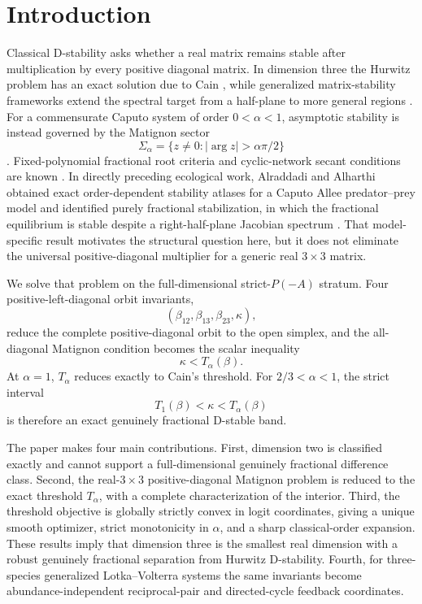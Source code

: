 \section{Introduction}

Classical D-stability asks whether a real matrix remains stable after multiplication by every positive diagonal matrix. In dimension three the Hurwitz problem has an exact solution due to Cain \citep{Cain1976}, while generalized matrix-stability frameworks extend the spectral target from a half-plane to more general regions \citep{Kushel2019,KushelPavani2022}. For a commensurate Caputo system of order \(0<\alpha<1\), asymptotic stability is instead governed by the Matignon sector
\[
\Sigma_\alpha=\{z\neq0:|\arg z|>\alpha\pi/2\}
\]
\citep{Matignon1996,BrandiburGarrappaKaslik2021}. Fixed-polynomial fractional root criteria and cyclic-network secant conditions are known \citep{CermakNechvatal2017,Bourafa2020,Siami2021}. In directly preceding ecological work, Alraddadi and Alharthi obtained exact order-dependent stability atlases for a Caputo Allee predator--prey model and identified purely fractional stabilization, in which the fractional equilibrium is stable despite a right-half-plane Jacobian spectrum \citep{AlraddadiAlharthi2026}. That model-specific result motivates the structural question here, but it does not eliminate the universal positive-diagonal multiplier for a generic real \(3\times3\) matrix.

We solve that problem on the full-dimensional strict-\(P(-A)\) stratum. Four positive-left-diagonal orbit invariants,
\[
(\beta_{12},\beta_{13},\beta_{23},\kappa),
\]
reduce the complete positive-diagonal orbit to the open simplex, and the all-diagonal Matignon condition becomes the scalar inequality
\[
\kappa<T_\alpha(\beta).
\]
At \(\alpha=1\), \(T_\alpha\) reduces exactly to Cain's threshold. For \(2/3<\alpha<1\), the strict interval
\[
T_1(\beta)<\kappa<T_\alpha(\beta)
\]
is therefore an exact genuinely fractional D-stable band.

The paper makes four main contributions. First, dimension two is classified exactly and cannot support a full-dimensional genuinely fractional difference class. Second, the real-\(3\times3\) positive-diagonal Matignon problem is reduced to the exact threshold \(T_\alpha\), with a complete characterization of the interior. Third, the threshold objective is globally strictly convex in logit coordinates, giving a unique smooth optimizer, strict monotonicity in \(\alpha\), and a sharp classical-order expansion. These results imply that dimension three is the smallest real dimension with a robust genuinely fractional separation from Hurwitz D-stability. Fourth, for three-species generalized Lotka--Volterra systems the same invariants become abundance-independent reciprocal-pair and directed-cycle feedback coordinates.

